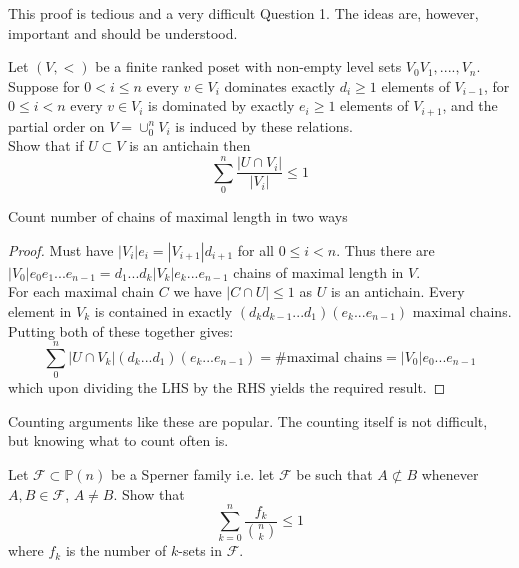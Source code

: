 \documentclass[a4paper]{article}
\renewcommand{\P}{\mathbb{P}}
\begin{document}
\begin{remark}
	This proof is tedious and a very difficult Question 1. The ideas are, however, important and should be understood.
\end{remark}

\begin{question}[Question 2]
	Let $(V, <)$ be a finite ranked poset with non-empty level sets $V_0 V_1,....,V_n$. Suppose for $0 < i \leq n$ every $v \in V_i$ dominates exactly $d_i \geq 1$ elements of $V_{i-1}$, for $0 \leq i < n$ every $v \in V_i$ is dominated by exactly $e_i \geq 1$ elements of $V_{i+1}$, and the partial order on $V = \cup_0^n V_i$ is induced by these relations.\\
	Show that if $U \subset V$ is an antichain then
	\[\sum_0^n{\frac{|U \cap V_i|}{|V_i|}} \leq 1\]
\end{question}
\begin{idea}
	Count number of chains of maximal length in two ways
\end{idea}
\begin{proof}
	Must have $|V_i|e_i = |V_{i+1}|d_{i+1}$ for all $0 \leq i < n$. Thus there are $|V_0| e_0 e_1 ... e_{n-1} = d_1 ... d_k |V_k|e_k ... e_{n-1}$ chains of maximal length in $V$.\\
	For each maximal chain $C$ we have $|C \cap U| \leq 1$ as $U$ is an antichain. Every element in $V_k$ is contained in exactly $(d_k d_{k-1} ... d_1)(e_k ... e_{n-1})$ maximal chains.\\
	Putting both of these together gives:
	\[\sum_0^n | U \cap V_k | (d_k ... d_ 1)(e_k ... e_{n-1}) = \# \text{maximal chains} = |V_0|e_0 ... e_{n-1}\]
	which upon dividing the LHS by the RHS yields the required result.

\end{proof}
\begin{remark}
	Counting arguments like these are popular. The counting itself is not difficult, but knowing what to count often is.
\end{remark}

\begin{question}[Question 3]
  Let $\mathcal{F} \subset \P(n)$ be a Sperner family i.e. let $\mathcal{F}$ be
  such that $A \not \subset B$ whenever $A, B \in \mathcal{F}$, $A \neq B$. Show
  that
  \[\sum_{k=0}^n \frac{f_k}{{n \choose k}} \leq 1\]
  where $f_k$ is the number of $k$-sets in $\mathcal{F}$.
\end{question}
\end{document}
